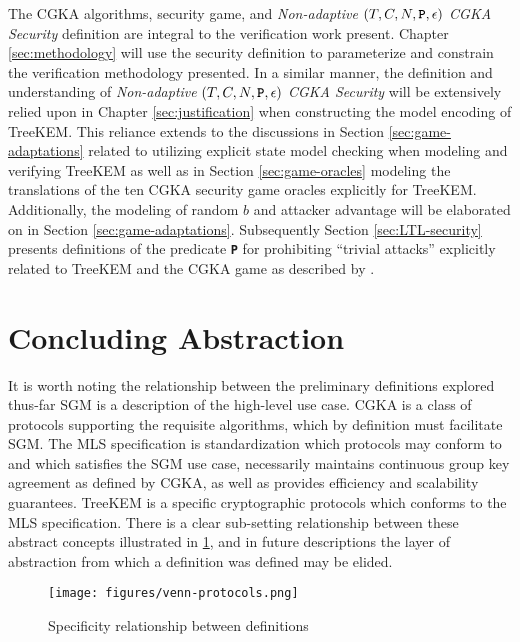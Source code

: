 The CGKA algorithms, security game, and \emph{Non-adaptive} \((T, C, N, \textbf{\texttt{P}}, \epsilon)\) \emph{CGKA Security} definition are integral to the verification work present.
Chapter \ref{sec:methodology} will use the security definition to parameterize and constrain the verification methodology presented.
In a similar manner, the definition and understanding of \emph{Non-adaptive} \((T, C, N, \textbf{\texttt{P}}, \epsilon)\) \emph{CGKA Security} will be extensively relied upon in Chapter \ref{sec:justification} when constructing the model encoding of TreeKEM.
This reliance extends to the discussions in Section \ref{sec:game-adaptations} related to utilizing explicit state model checking when modeling and verifying TreeKEM
as well as in Section \ref{sec:game-oracles} modeling the translations of the ten CGKA security game oracles explicitly for TreeKEM.
Additionally, the modeling of random \(b\) and attacker advantage will be elaborated on in Section \ref{sec:game-adaptations}.
Subsequently Section \ref{sec:LTL-security} presents definitions of the predicate \textbf{\texttt{P}} for prohibiting ``trivial attacks'' explicitly related to TreeKEM and the CGKA game as described by \autocite{alwen2020security}.

\hypertarget{concluding-abstraction}{%
\section{Concluding Abstraction}\label{concluding-abstraction}}

It is worth noting the relationship between the preliminary definitions explored thus-far
SGM is a description of the high-level use case.
CGKA is a class of protocols supporting the requisite algorithms, which by definition must facilitate SGM.
The MLS specification is standardization which protocols may conform to and which satisfies the SGM use case, necessarily maintains continuous group key agreement as defined by CGKA, as well as provides efficiency and scalability guarantees.
TreeKEM is a specific cryptographic protocols which conforms to the MLS specification.
There is a clear sub-setting relationship between these abstract concepts illustrated in \ref{fig:venn-protocols}, and in future descriptions the layer of abstraction from which a definition was defined may be elided.

\begin{figure}
\centering
\texttt{[image: figures/venn-protocols.png]}
\caption{Specificity relationship between definitions \label{fig:venn-protocols}}
\end{figure}

